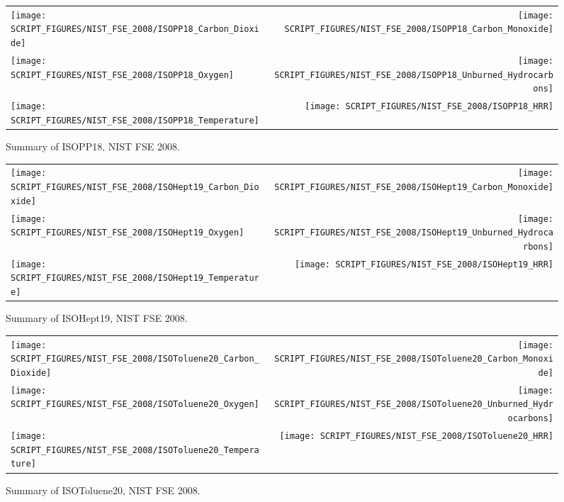 \clearpage

\begin{figure}[h]
\begin{tabular*}{\textwidth}{l@{\extracolsep{\fill}}r}
\texttt{[image: SCRIPT\_FIGURES/NIST\_FSE\_2008/ISOPP18\_Carbon\_Dioxide]} &
\texttt{[image: SCRIPT\_FIGURES/NIST\_FSE\_2008/ISOPP18\_Carbon\_Monoxide]} \\
\texttt{[image: SCRIPT\_FIGURES/NIST\_FSE\_2008/ISOPP18\_Oxygen]} &
\texttt{[image: SCRIPT\_FIGURES/NIST\_FSE\_2008/ISOPP18\_Unburned\_Hydrocarbons]} \\
\texttt{[image: SCRIPT\_FIGURES/NIST\_FSE\_2008/ISOPP18\_Temperature]} &
\texttt{[image: SCRIPT\_FIGURES/NIST\_FSE\_2008/ISOPP18\_HRR]}
\end{tabular*}
\caption[Summary of ISOPP18, NIST FSE 2008]{Summary of ISOPP18, NIST FSE 2008.}
\label{NIST_FSE_1994_ISOPP18}
\end{figure}

\begin{figure}[h]
\begin{tabular*}{\textwidth}{l@{\extracolsep{\fill}}r}
\texttt{[image: SCRIPT\_FIGURES/NIST\_FSE\_2008/ISOHept19\_Carbon\_Dioxide]} &
\texttt{[image: SCRIPT\_FIGURES/NIST\_FSE\_2008/ISOHept19\_Carbon\_Monoxide]} \\
\texttt{[image: SCRIPT\_FIGURES/NIST\_FSE\_2008/ISOHept19\_Oxygen]} &
\texttt{[image: SCRIPT\_FIGURES/NIST\_FSE\_2008/ISOHept19\_Unburned\_Hydrocarbons]} \\
\texttt{[image: SCRIPT\_FIGURES/NIST\_FSE\_2008/ISOHept19\_Temperature]} &
\texttt{[image: SCRIPT\_FIGURES/NIST\_FSE\_2008/ISOHept19\_HRR]}
\end{tabular*}
\caption[Summary of ISOHept19, NIST FSE 2008]{Summary of ISOHept19, NIST FSE 2008.}
\label{NIST_FSE_1994_ISOHept19}
\end{figure}

\begin{figure}[h]
\begin{tabular*}{\textwidth}{l@{\extracolsep{\fill}}r}
\texttt{[image: SCRIPT\_FIGURES/NIST\_FSE\_2008/ISOToluene20\_Carbon\_Dioxide]} &
\texttt{[image: SCRIPT\_FIGURES/NIST\_FSE\_2008/ISOToluene20\_Carbon\_Monoxide]} \\
\texttt{[image: SCRIPT\_FIGURES/NIST\_FSE\_2008/ISOToluene20\_Oxygen]} &
\texttt{[image: SCRIPT\_FIGURES/NIST\_FSE\_2008/ISOToluene20\_Unburned\_Hydrocarbons]} \\
\texttt{[image: SCRIPT\_FIGURES/NIST\_FSE\_2008/ISOToluene20\_Temperature]} &
\texttt{[image: SCRIPT\_FIGURES/NIST\_FSE\_2008/ISOToluene20\_HRR]}
\end{tabular*}
\caption[Summary of ISOToluene20, NIST FSE 2008]{Summary of ISOToluene20, NIST FSE 2008.}
\label{NIST_FSE_1994_ISOToluene20}
\end{figure}

